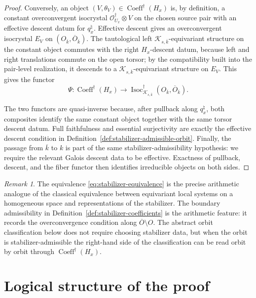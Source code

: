 \documentclass[11pt]{amsart}
\theoremstyle{plain}
\theoremstyle{definition}
\theoremstyle{remark}
\newtheorem{remark}{Remark}[section]
\newcommand{\Isoc}{\operatorname{Isoc}}
\newcommand{\Coeff}{\operatorname{Coeff}}
\begin{document}
\begin{proof}
Conversely, an object \((V,\theta_V)\in\Coeff^\dagger(H_x)\) is, by definition,
a constant overconvergent isocrystal \(\mathcal O^\dagger_{U_x}\otimes V\) on
the chosen source pair with an effective descent datum for \(q_x^\natural\).
Effective descent gives an overconvergent isocrystal \(E_V\) on
\((O_{\overline k},\overline O_{\overline k})\).  The tautological left
\(\mathcal K_{s,\overline k}\)-equivariant structure on the constant object
commutes with the right \(H_x\)-descent datum, because left and right
translations commute on the open torsor; by the compatibility built into the
pair-level realization, it descends to a \(\mathcal K_{s,\overline k}\)-equivariant
structure on \(E_V\).  This gives the functor
\[
  \Psi:\Coeff^\dagger(H_x)
  \longrightarrow
  \Isoc^\dagger_{\mathcal K_{s,\overline k}}(O_{\overline k},\overline O_{\overline k}).
\]

The two functors are quasi-inverse because, after pullback along
\(q_x^\natural\), both composites identify the same constant object together
with the same torsor descent datum.  Full faithfulness and essential surjectivity
are exactly the effective descent condition in
Definition~\ref{def:stabilizer-admissible-orbit}.  Finally, the passage from
\(\overline k\) to \(k\) is part of the same stabilizer-admissibility hypothesis:
we require the relevant Galois descent data to be effective.  Exactness of
pullback, descent, and the fiber functor then identifies irreducible objects on
both sides.
\end{proof}

\begin{remark}
\label{rem:stabilizer-description-use}
The equivalence \eqref{eq:stabilizer-equivalence} is the precise arithmetic
analogue of the classical equivalence between equivariant local systems on a
homogeneous space and representations of the stabilizer.  The boundary
admissibility in Definition~\ref{def:stabilizer-coefficients} is the arithmetic
feature: it records the overconvergence condition along
\(\overline O\setminus O\).  The abstract orbit classification below does not
require choosing stabilizer data, but when the orbit is stabilizer-admissible
the right-hand side of the classification can be read orbit by orbit through
\(\Coeff^\dagger(H_x)\).
\end{remark}


\section{Logical structure of the proof}
\label{app:logical-structure}
\end{document}
